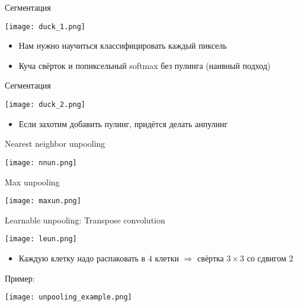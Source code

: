 \documentclass[notes,12pt, aspectratio=169]{beamer}
\begin{document}
\begin{frame}{Сегментация}
	\begin{center}
		\texttt{[image: duck\_1.png]}
	\end{center}
	\begin{itemize}
		\item Нам нужно научиться классифицировать каждый пиксель
		\item Куча свёрток и попиксельный softmax без пулинга (наивный подход)
	\end{itemize}
\end{frame}


\begin{frame}{Сегментация}
	\begin{center}
		\texttt{[image: duck\_2.png]}
	\end{center}
	\begin{itemize}
		\item Если захотим добавить пулинг, придётся делать анпулинг
	\end{itemize}
\end{frame}


\begin{frame}{Nearest neighbor unpooling}
	\begin{center}
		\texttt{[image: nnun.png]}
	\end{center}
\end{frame}


\begin{frame}{Max unpooling}
	\begin{center}
		\texttt{[image: maxun.png]}
	\end{center}
\end{frame}


\begin{frame}{Learnable unpooling: Transpose convolution}
	\begin{center}
	\texttt{[image: leun.png]}
	\end{center}
	\begin{itemize}
		\item Каждую клетку надо распаковать в $4$ клетки $\Rightarrow$ свёртка $3 \times 3$ со сдвигом $2$
	\end{itemize}
\end{frame}


\begin{frame}{Пример:}
	\begin{center}
		\texttt{[image: unpooling\_example.png]}
	\end{center}
\end{frame}
\end{document}
